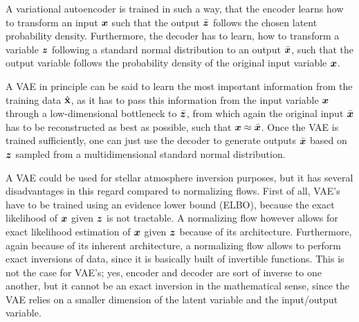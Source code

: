 \documentclass[a4paper,12pt]{report}
\begin{document}
A variational autoencoder is trained in such a way, that the encoder learns how to transform an input $\bm{x}$ such that the output $\bar{\bm{z}}$ follows the chosen latent probability density. Furthermore, the decoder has to learn, how to transform a variable $\bm{z}$ following a standard normal distribution to an output $\bar{\bm{x}}$, such that the output variable follows the probability density of the original input variable $\bm{x}$.

A VAE in principle can be said to learn the most important information from the training data $\hat{\boldsymbol{\mathbf{x}}}$, as it has to pass this information from the input variable $\bm{x}$ through a low-dimensional bottleneck to $\bar{\bm{z}}$, from which again the original input $\bar{\bm{x}}$ has to be reconstructed as best as possible, such that $\bm{x} \approx \bar{\bm{x}}$. Once the VAE is trained sufficiently, one can just use the decoder to generate outputs $\bar{\bm{x}}$ based on $\bm{z}$ sampled from a multidimensional standard normal distribution.

A VAE could be used for stellar atmosphere inversion purposes, but it has several disadvantages in this regard compared to normalizing flows. First of all, VAE's have to be trained using an evidence lower bound (ELBO), because the exact likelihood of $\bm{x}$ given $\bm{z}$ is not tractable. A normalizing flow however allows for exact likelihood estimation of $\bm{x}$ given $\bm{z}$ because of its architecture. Furthermore, again because of its inherent architecture, a normalizing flow allows to perform exact inversions of data, since it is basically built of invertible functions. This is not the case for VAE's; yes, encoder and decoder are sort of inverse to one another, but it cannot be an exact inversion in the mathematical sense, since the VAE relies on a smaller dimension of the latent variable and the input/output variable.
\end{document}
